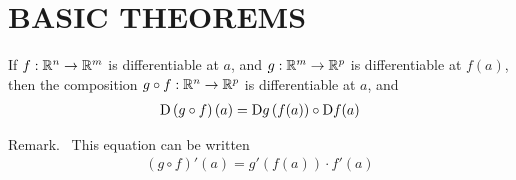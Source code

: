 \section{BASIC THEOREMS}
\begin{theorem}
    If $f:\mathbb{R}^n\to \mathbb{R}^m$ is differentiable at $a$, and $g: \mathbb{R}^m\to \mathbb{R}^p$ is 
    differentiable at $f(a)$, then the composition $g\circ f:\mathbb{R}^n\to \mathbb{R}^p$ is differentiable
    at $a$, and 
    \begin{align*}
        \mathrm{D}\left(g\circ f\right)(a) = \mathrm{D}g\left(f(a)\right)\circ \mathrm{D}f(a)
    \end{align*}

    Remark.~ This equation can be written 
    \begin{align*}
        (g\circ f)'(a) = g'(f(a))\cdot f'(a)
    \end{align*}
\end{theorem}

